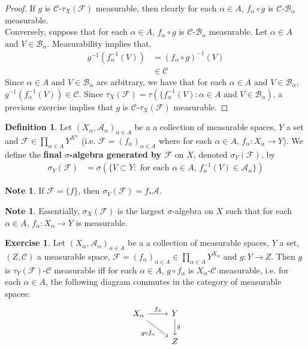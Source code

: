 \documentclass[12pt]{amsart}
\theoremstyle{definition}
\newtheorem{defn}[definition]{Definition}
\newtheorem{note}[definition]{Note}
\newtheorem{ex}[definition]{Exercise}
\newcommand{\al}{\alpha}
\newcommand{\sig}{\sigma}
\newcommand{\MA}{\mathcal{A}}
\newcommand{\MC}{\mathcal{C}}
\newcommand{\MB}{\mathcal{B}}
\newcommand{\MF}{\mathcal{F}}
\newcommand{\ld}[1]{\label{defn:#1}}
\begin{document}
	\begin{proof}
		If $g$ is $\MC$-$\tau_X(\MF)$ measurable, then clearly for each $\al \in A$, $ f_{\al} \circ g$ is $\MC$-$\MB_{\al}$ measurable. \\
		Conversely, suppose that for each $\al \in A$, $f_{\al} \circ g$ is $\MC$-$\MB_{\al}$ measurable. Let $\al \in A$ and $V \in \MB_{\al}$. Measurability implies that,
		\begin{align*}
			g^{-1}(f_{\al}^{-1}(V)) 
			& = (f_{\al} \circ g)^{-1}(V) \\
			& \in \MC
		\end{align*}
		Since $\al \in A$ and $V \in \MB_{\al}$ are arbitrary, we have that for each $\al \in A$ and $V \in \MB_{\al}$, $g^{-1}(f_{\al}^{-1}(V)) \in \MC$. Since $\tau_X(\MF) = \tau(\{f_{\al}^{-1}(V): \al \in A \text{ and } V \in \MB_{\al})$, a previous exercise implies that $g$ is $\MC$-$\tau_X(\MF)$  measurable.
	\end{proof}
	
	\begin{defn} \ld{}
		Let $(X_{\al}, \MA_{\al})_{\al \in A}$ be a a collection of measurable spaces, $Y$ a set and $\MF \in \prod \limits_{\al \in A}Y^{X^{\al}}$ (i.e. $\MF = (f_{\al})_{\al \in A}$ where for each $\al \in A$, $f_{\al}:X_{\al} \rightarrow Y$). We define the \textbf{final $\sig$-algebra generated by $\MF$} on $X$, denoted $\sig_Y(\MF)$, by 
		\begin{align*}
			\sig_Y(\MF) 
			&= \sig(\{V \subset Y: \text{ for each $\al \in A$, $f_{\al}^{-1}(V) \in \MA_{\al}$}\})
		\end{align*}	 
	\end{defn}
	
	\begin{note}
		If $\MF = \{f\}$, then $\sig_Y(\MF) = f_*\MA$.
	\end{note}
	
	\begin{note}
		Essentially, $\sig_X(\MF)$ is the largest $\sig$-algebra on $X$ such that for each $\al \in A$, $f_{\al}:X_{\al} \rightarrow Y$ is measurable. 
	\end{note}
	
	\begin{ex}
		Let $(X_{\al}, \MA_{\al})_{\al \in A}$ be a a collection of measurable spaces, $Y$ a set, $(Z, \MC)$ a measurable space, $\MF = (f_{\al})_{\al \in A} \in \prod \limits_{\al \in A}Y^{X_{\al}}$ and $g: Y \rightarrow Z$. Then $g$ is $\tau_Y(\MF)$-$\MC$ measurable iff for each $\al \in A$, $g \circ f_{\al}$ is $X_{\al}$-$\MC$ measurable, i.e. for each $\al \in A$, the following diagram commutes in the category of measurable spaces: 
		\[ \begin{tikzcd}
			X_{\al} \arrow[r, "f_{\al}"] \arrow[dr, "g \circ f_{\al}"'] 	
			& Y  \arrow[d, "g"] \\
			& Z 
		\end{tikzcd}
		\]
	\end{ex}
	
\end{document}
